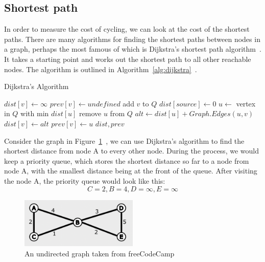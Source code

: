 \documentclass[12pt,a4paper]{report}
\begin{document}
\subsection{Shortest path}
In order to measure the cost of cycling, we can look at the cost of the shortest paths. There are many algorithms for finding the shortest paths between nodes in a graph, perhaps the most famous of which is Dijkstra's shortest path algorithm~\cite{dijkstra1959note}. It takes a starting point and works out the shortest path to all other reachable nodes. The algorithm is outlined in Algorithm~\ref{alg:dijkstra}~\cite{WikipediaEN:dijkstra}.

\begin{algorithm}
\caption{Dijkstra's Algorithm}\label{alg:dijkstra}
\begin{algorithmic}
        \State $dist[v]\gets \infty$
        \State $prev[v]\gets undefined$
        \State add $v$ to $Q$
    \EndFor
    \State $dist[source]\gets 0$
        \State $u\gets$ vertex in $Q$ with min $dist[u]$
        \State remove $u$ from $Q$
            \State $alt \gets dist[u] + Graph.Edges(u, v)$
                \State $dist[v]\gets alt$
                \State $prev[v]\gets u$
            \EndIf
        \EndFor
    \EndWhile
    \State \Return $dist, prev$
\EndFunction
\end{algorithmic}
\end{algorithm}

Consider the graph in Figure~\ref{fig:dijkstra_example}~\cite{abba2022}, we can use Dijkstra's algorithm to find the shortest distance from node A to every other node. During the process, we would keep a priority queue, which stores the shortest distance so far to a node from node A, with the smallest distance being at the front of the queue. After visiting the node A, the priority queue would look like this:
\[C=2, B=4, D=\infty, E=\infty\]

\begin{figure}[ht]
\centering
\includegraphics[width=0.5\textwidth]{plan_images/dijkstra.png}
\caption{An undirected graph taken from freeCodeCamp~\cite{abba2022}}
\label{fig:dijkstra_example}
\end{figure}
\end{document}

